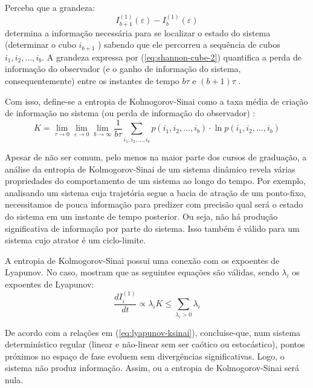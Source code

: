 \documentclass[a4paper, 12pt]{article}
\begin{document}
Perceba que a grandeza:
\begin{equation}\label{eq:shannon-cube-2}
I_{b+1}^{(1)} (\varepsilon) - I_{b}^{(1)} (\varepsilon)
\end{equation}
determina a informação necessária para se localizar o estado do sistema (determinar o cubo $i_{b+1}$ ) sabendo que ele percorreu a sequência de cubos $i_1, i_2, ..., i_b$. A grandeza expressa por (\ref{eq:shannon-cube-2}) quantifica a perda de informação do observador (e o ganho de informação do sistema, consequentemente) entre os instantes de tempo $b \tau$ e $(b+1)\tau$ \cite{attux2001dinamica}.

Com isso, define-se a entropia de Kolmogorov-Sinai como a taxa média de criação de informação no sistema (ou perda de informação do observador) \cite{fiedler1994caos, attux2001dinamica}:
\begin{equation}\label{eq:kolmogorov-sinai}
K = \lim_{\tau \rightarrow 0} \lim_{\varepsilon \rightarrow 0} \lim_{b \rightarrow \infty} \frac{1}{b\tau} \sum_{i_1, i_2, ..., i_b} p(i_1, i_2, ..., i_b) \cdot \ln p(i_1, i_2, ..., i_b)
\end{equation}

Apesar de não ser comum, pelo menos na maior parte dos cursos de graduação, a análise da entropia de Kolmogorov-Sinai de um sistema dinâmico revela várias propriedades do comportamento de um sistema ao longo do tempo. Por exemplo, analisando um sistema cuja trajetória segue a bacia de atração de um ponto-fixo, necessitamos de pouca informação para predizer com precisão qual será o estado do sistema em um instante de tempo posterior. Ou seja, não há produção significativa de informação por parte do sistema. Isso também é válido para um sistema cujo atrator é um ciclo-limite.

A entropia de Kolmogorov-Sinai possui uma conexão com os expoentes de Lyapunov. No caso, \cite{attux2001dinamica, fiedler1994caos} mostram que as seguintes equações são válidas, sendo $\lambda_i$ os expoentes de Lyapunov:
\begin{subequations}\label{eq:lyapunov-ksinai}
\begin{equation}
\frac{dI_{i}^{(1)}}{dt} \propto \lambda_i
\end{equation}
\begin{equation}\label{eq:lyapunov-ksinai-entropy}
K \leq \sum_{\lambda_i > 0} \lambda_i
\end{equation}
\end{subequations}

De acordo com a relações em (\ref{eq:lyapunov-ksinai}), concluise-que, num sistema determinístico regular (linear e não-linear sem ser caótico ou estocástico), pontos próximos no espaço de fase evoluem sem divergências significativas. Logo, o sistema não produz informação. Assim, ou a entropia de Kolmogorov-Sinai será nula.
\end{document}
